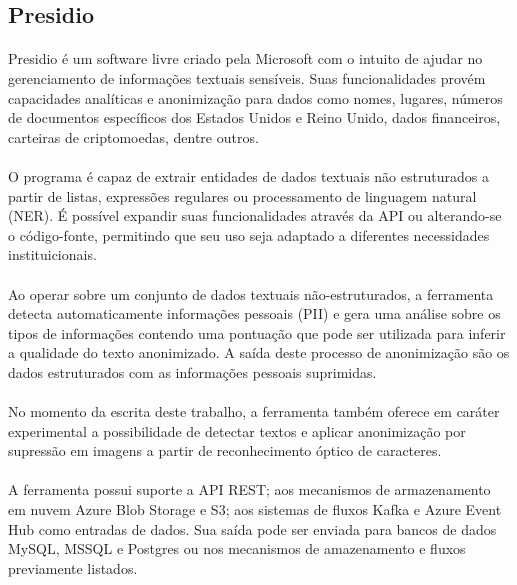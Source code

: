 \subsection{Presidio}

\paragraph{} Presidio é um software livre criado pela Microsoft\cite{presidio} com o intuito de ajudar no gerenciamento de informações textuais sensíveis. 
Suas funcionalidades provém capacidades analíticas e anonimização para dados como nomes, lugares, números de documentos específicos dos Estados Unidos e Reino Unido, 
dados financeiros, carteiras de criptomoedas, dentre outros. 

\paragraph{} O programa é capaz de extrair entidades de dados textuais não estruturados a partir de listas, expressões regulares ou processamento de linguagem natural (NER). 
É possível expandir suas funcionalidades através da API ou alterando-se o código-fonte, permitindo que seu uso seja adaptado a diferentes necessidades instituicionais.

\paragraph{} Ao operar sobre um conjunto de dados textuais não-estruturados, a ferramenta detecta automaticamente informações pessoais (PII) e gera uma análise sobre os tipos de informações
contendo uma pontuação que pode ser utilizada para inferir a qualidade do texto anonimizado. A saída deste processo de anonimização são os dados estruturados com as informações pessoais suprimidas.

\paragraph{} No momento da escrita deste trabalho, a ferramenta também oferece em caráter experimental a possibilidade de detectar textos e aplicar anonimização por supressão em imagens 
a partir de reconhecimento óptico de caracteres.

\paragraph{} A ferramenta possui suporte a API REST; aos mecanismos de armazenamento em nuvem Azure Blob Storage e S3; aos sistemas de fluxos Kafka e Azure Event Hub como entradas de dados.
Sua saída pode ser enviada para bancos de dados MySQL, MSSQL e Postgres ou nos mecanismos de amazenamento e fluxos previamente listados.

